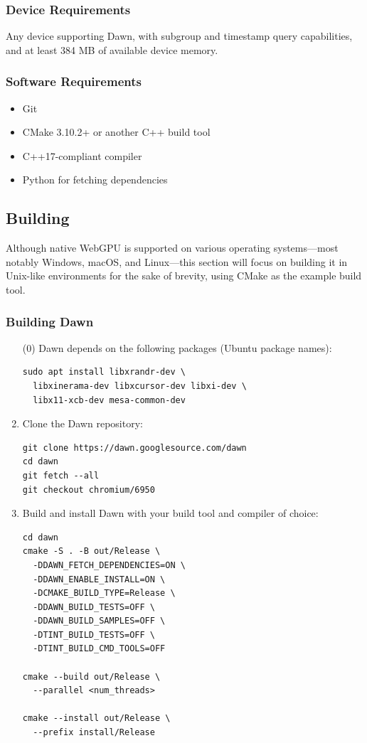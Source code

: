 \documentclass[sigconf]{acmart}
\begin{document}
\subsubsection{Device Requirements}
Any device supporting Dawn, with subgroup and timestamp query capabilities, and at least 384 MB of available device memory.

\subsubsection{Software Requirements}
\begin{itemize}
  \item Git
  \item CMake 3.10.2+ or another C++ build tool
  \item C++17-compliant compiler
  \item Python for fetching dependencies
\end{itemize}

\subsection{Building}
Although native WebGPU is supported on various operating systems—most notably Windows, macOS, and Linux—this section will focus on building it in Unix-like environments for the sake of brevity, using CMake as the example build tool.

\subsubsection{Building Dawn}
\begin{enumerate}
  \item[(0)] Dawn depends on the following packages (Ubuntu package names):
  \begin{lstlisting}[basicstyle=\ttfamily\small, frame=single]
sudo apt install libxrandr-dev \
  libxinerama-dev libxcursor-dev libxi-dev \
  libx11-xcb-dev mesa-common-dev
  \end{lstlisting}
  
  \item Clone the Dawn repository:
  \begin{lstlisting}[basicstyle=\ttfamily\small, frame=single]
git clone https://dawn.googlesource.com/dawn
cd dawn
git fetch --all
git checkout chromium/6950
  \end{lstlisting}
  
  \item Build and install Dawn with your build tool and compiler of choice:
  \begin{lstlisting}[basicstyle=\ttfamily\small, frame=single]
cd dawn
cmake -S . -B out/Release \
  -DDAWN_FETCH_DEPENDENCIES=ON \
  -DDAWN_ENABLE_INSTALL=ON \
  -DCMAKE_BUILD_TYPE=Release \
  -DDAWN_BUILD_TESTS=OFF \
  -DDAWN_BUILD_SAMPLES=OFF \
  -DTINT_BUILD_TESTS=OFF \
  -DTINT_BUILD_CMD_TOOLS=OFF

cmake --build out/Release \
  --parallel <num_threads>

cmake --install out/Release \
  --prefix install/Release
  \end{lstlisting}
\end{enumerate}
\end{document}
